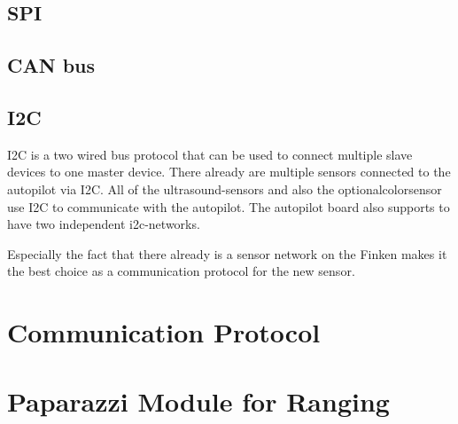 \subsection{SPI}

\subsection{CAN bus}

\subsection{I2C}
I2C is a two wired bus protocol that can be used to connect multiple slave devices to one master device.
There already are multiple sensors connected to the autopilot via I2C.
All of the ultrasound-sensors and also the optionalcolorsensor use I2C to communicate with the autopilot.
The autopilot board also supports to have two independent i2c-networks.

Especially the fact that there already is a sensor network on the Finken makes it the best choice as a communication protocol for the new sensor.


\section{Communication Protocol}



\section{Paparazzi Module for Ranging}

